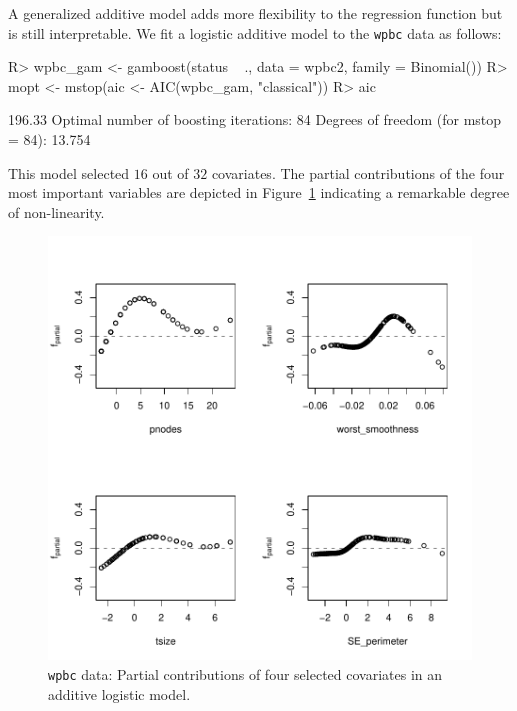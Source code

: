 \documentclass{article}
\newcommand{\Robject}[1]{\texttt{#1}}
\newenvironment{Schunk}{}{}
\begin{document}
A generalized additive model adds more flexibility to the regression function but is still
interpretable. We fit a logistic additive model to the \Robject{wpbc} data as follows:
\begin{Schunk}
\begin{Sinput}
R> wpbc_gam <- gamboost(status ~ ., data = wpbc2, 
         family = Binomial())
R> mopt <- mstop(aic <- AIC(wpbc_gam, "classical"))
R> aic
\end{Sinput}
\begin{Soutput}
[1] 196.33
Optimal number of boosting iterations: 84 
Degrees of freedom (for mstop = 84): 13.754 
\end{Soutput}
\end{Schunk}
This model selected $16$ out of $32$
covariates. The partial contributions of the four most important variables
are depicted in  
Figure~\ref{wpbc-gamboost-plot} indicating a remarkable degree of non-linearity.
\begin{figure}
\begin{center}
\includegraphics{figures/BH-wpbc-gamboost-plot}
\caption{\Robject{wpbc} data: Partial contributions of four selected 
    covariates in an additive logistic model.
    \label{wpbc-gamboost-plot}}
\end{center}
\end{figure}
\end{document}
